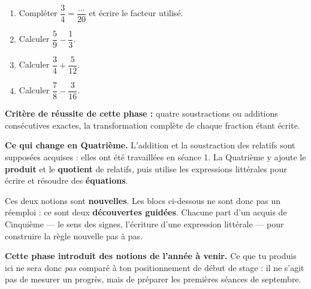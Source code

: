 \documentclass[10pt,a4paper]{article}
\begin{document}
\begin{enumerate}
\needspace{18mm}
\item Compléter $\dfrac{3}{4}=\dfrac{\ldots}{20}$ et écrire le facteur utilisé.
\needspace{18mm}
\item Calculer $\dfrac{5}{9}-\dfrac{1}{3}$.
\needspace{18mm}
\item Calculer $\dfrac{3}{4}+\dfrac{5}{12}$.
\needspace{18mm}
\item Calculer $\dfrac{7}{8}-\dfrac{3}{16}$.
\end{enumerate}
\begin{successbox}\textbf{Critère de réussite de cette phase :} quatre soustractions ou additions consécutives exactes, la transformation complète de chaque fraction étant écrite.\end{successbox}
\certline
\needspace{62mm}\par\vspace{3mm}

\begin{methodbox}
\textbf{Ce qui change en Quatrième.} L'addition et la soustraction des relatifs sont supposées acquises :
elles ont été travaillées en séance 1. La Quatrième y ajoute le \textbf{produit} et le \textbf{quotient} de
relatifs, puis utilise les expressions littérales pour écrire et résoudre des \textbf{équations}.
\par\smallskip
Ces deux notions sont \textbf{nouvelles}. Les blocs ci-dessous ne sont donc pas un réemploi : ce sont deux
\textbf{découvertes guidées}. Chacune part d'un acquis de Cinquième — le sens des signes, l'écriture d'une
expression littérale — pour construire la règle nouvelle pas à pas.
\end{methodbox}
\begin{warningbox}\small
\textbf{Cette phase introduit des notions de l'année à venir.} Ce que tu produis ici ne sera donc
\emph{pas} comparé à ton positionnement de début de stage : il ne s'agit pas de mesurer un progrès,
mais de préparer les premières séances de septembre.
\end{warningbox}
\end{document}
